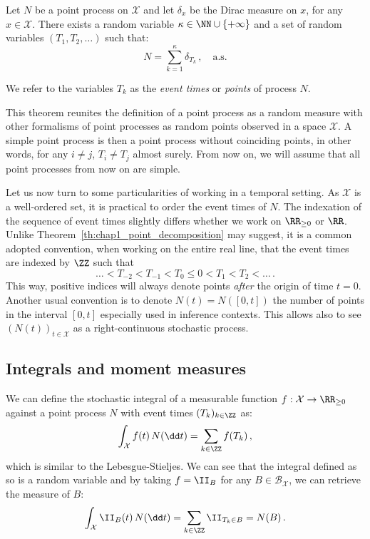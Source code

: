 \begin{theorem}{\parencite[Corollary 6.5]{Last2017}}\label{th:chap1_point_decomposition}

    Let $N$ be a point process on $\mathcal{X}$ and let $\delta_x$ be the Dirac measure on $x$, for any $x\in\mathcal{X}$.
    There exists a random variable $\kappa\in\NN\cup \{+\infty\}$ and a set of random variables $(T_1, T_2, \ldots)$ such that:
    \[N = \sum_{k=1}^{\kappa}{\delta_{T_k}}\,,\quad \text{a.s.}\]  

    We refer to the variables $T_k$ as the \emph{event times} or \emph{points} of process $N$.
\end{theorem}
This theorem reunites the definition of a point process as a random measure with other formalisms of point processes as random points observed in a space $\mathcal{X}$.
A simple point process is then a point process without coinciding points, in other words, for any $i\neq j$, $T_i \neq T_j$ almost surely.
From now on, we will assume that all point processes from now on are simple.

Let us now turn to some particularities of working in a temporal setting. As $\mathcal{X}$ is a well-ordered set, it is practical to order the event times of $N$.
The indexation of the sequence of event times slightly differs whether we work on $\RR_{\geq 0}$ or $\RR$. 
Unlike Theorem~\ref{th:chap1_point_decomposition} may suggest, it is a common adopted convention, when working on the entire real line, that the event times are indexed by $\ZZ$ such that \[\ldots < T_{-2} < T_{-1} < T_{0} \leq 0 < T_1 < T_2 < \ldots\,.\]
This way, positive indices will always denote points \emph{after} the origin of time $t=0$.
Another usual convention is to denote $N(t) = N([0, t])$ the number of points in the interval $[0, t]$ especially used in inference contexts.
This allows also to see $(N(t))_{t\in\mathcal{X}}$ as a right-continuous stochastic process.

\subsection{Integrals and moment measures}

We can define the stochastic integral of a measurable function $f:\mathcal{X}\to \RR_{\geq 0}$ against a point process $N$ with event times $(T_k)_{k\in\ZZ}$ as:
\[\int_{\mathcal{X}}{f(t)\, N(\dd t)} = \sum_{k\in\ZZ}{f(T_k)}\,,\]
which is similar to the Lebesgue-Stieljes.
We can see that the integral defined as so is a random variable and by taking $f=\II_{B}$ for any $B\in\mathcal{B}_{\mathcal{X}}$, we can retrieve the measure of $B$:
\[\int_{\mathcal{X}}{\II_{B}(t)\, N(\dd t)} = \sum_{k\in\ZZ}{\II_{T_k \in B}} = N(B)\,.\]

